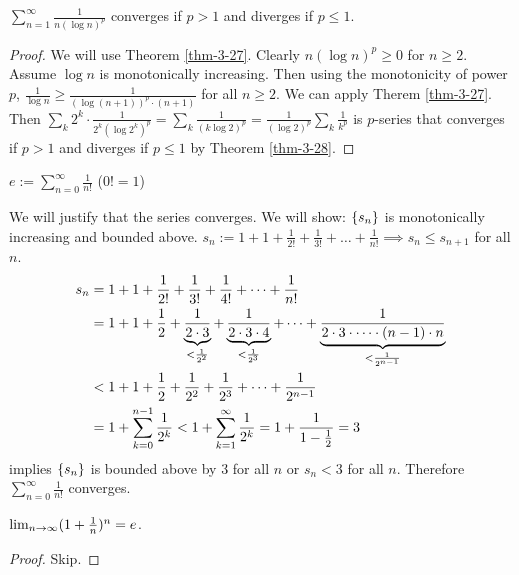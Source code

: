 \documentclass[]{article}
\begin{document}
\begin{theorem}
	 $\sum_{n=1}^\infty\frac{1}{n(\log n)^p}$ converges if $p>1$ and diverges if $p\leq 1$.
\end{theorem}
\begin{proof}
	We will use Theorem \ref{thm-3-27}. Clearly $n(\log n)^p\geq 0$ for $n\geq 2$.
	Assume $\log n$ is monotonically increasing.
	Then using the monotonicity of power $p$, $\frac{1}{\log n}\geq\frac{1}{(\log{(n+1)})^p\cdot(n+1)}$ for all $n\geq 2$.
	We can apply Therem \ref{thm-3-27}.
	Then $\sum_k 2^k\cdot\frac{1}{2^k(\log{2^k})^p} = \sum_k \frac{1}{(k\log2)^p} = \frac{1}{(\log 2)^p}\sum_k\frac{1}{k^p}$ is $p$-series that converges if $p>1$ and diverges if $p\leq 1$ by Theorem \ref{thm-3-28}.
\end{proof}

\newpage
\begin{definition}
	[$e$] $e:=\sum_{n=0}^\infty\frac{1}{n!}$ ($0! = 1$)
\end{definition}
We will justify that the series converges.
We will show: $\set{s_n}$ is monotonically increasing and bounded above.
$s_n:= 1+1+\frac{1}{2!} + \frac{1}{3!} + \dots + \frac{1}{n!} \implies s_n\leq s_{n+1}$ for all $n$.
\begin{align*}
	s_n &= 1+1+\frac{1}{2!}+\frac{1}{3!}+\frac{1}{4!}+\dots+\frac{1}{n!} \\
		&= 1+1+\frac{1}{2}+\ub{<\frac{1}{2^2}}{\frac{1}{2\cdot3}}+\ub{<\frac{1}{2^3}}{\frac{1}{2\cdot3\cdot4}}+\dots+\ub{<\frac{1}{2^{n-1}}}{\frac{1}{2\cdot3\cdot\dots\cdot(n-1)\cdot n}} \\
		&< 1+1+\frac{1}{2}+\frac{1}{2^2}+\frac{1}{2^3}+\dots+\frac{1}{2^{n-1}} \\
		&= 1+\sum_{k=0}^{n-1}\frac{1}{2^k} < 1 + \sum_{k=1}^\infty\frac{1}{2^k} = 1 + \frac{1}{1-\frac{1}{2}} = 3
\end{align*}
implies $\set{s_n}$ is bounded above by 3 for all $n$ or $s_n<3$ for all $n$.
Therefore $\sum_{n=0}^\infty\frac{1}{n!}$ converges.

\begin{theorem}
	$\lim_{n\ra\infty}(1+\frac{1}{n})^n = e$.
\end{theorem}
\begin{proof}
	Skip.
\end{proof}
\end{document}
